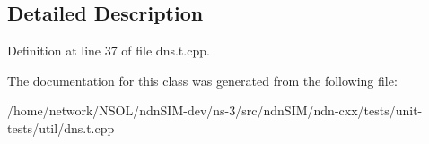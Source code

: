 \subsection{Detailed Description}


Definition at line 37 of file dns.\+t.\+cpp.



The documentation for this class was generated from the following file\+:\begin{DoxyCompactItemize}
\item 
/home/network/\+N\+S\+O\+L/ndn\+S\+I\+M-\/dev/ns-\/3/src/ndn\+S\+I\+M/ndn-\/cxx/tests/unit-\/tests/util/dns.\+t.\+cpp\end{DoxyCompactItemize}
